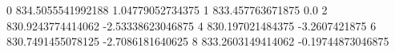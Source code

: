 0 834.5055541992188 1.04779052734375
1 833.457763671875 0.0
2 830.9243774414062 -2.53338623046875
4 830.197021484375 -3.2607421875
6 830.7491455078125 -2.7086181640625
8 833.2603149414062 -0.19744873046875
